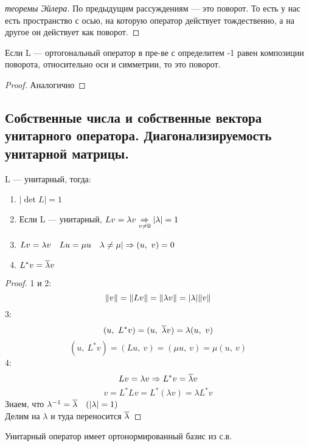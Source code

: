 \documentclass[main]{subfiles}
\begin{document}
\begin{proof}[теоремы Эйлера]
        По предыдущим рассуждениям --- это поворот. То есть у нас есть пространство с осью, на которую оператор действует тождественно, а на другое он действует как поворот.
    \end{proof}

    \begin{utv}
        Если L --- ортогональный оператор в пре-ве с определитем -1 равен композиции поворота, относительно оси и симметрии, то это поворот.
    \end{utv}

    \begin{proof}
        Аналогично
    \end{proof}

    \newpage
    \subsection{Собственные числа и собственные вектора унитарного оператора. Диагонализируемость унитарной матрицы.}

    \begin{utv}
        L --- унитарный, тогда:
		\begin{enumerate}
			\item $|\det L| = 1$
			\item Если L --- унитарный, $Lv = \lambda v \underset{v \neq 0}{\Rightarrow} |\lambda| = 1$
			\item $Lv = \lambda v \quad Lu = \mu u \quad \lambda \neq \mu | \Rightarrow (u,\ v) = 0$
            \item $L^* v = \overline{\lambda} v$
		\end{enumerate}
	\end{utv}

	\begin{proof}
		1 и 2:
		\[\lVert v \rVert = \lVert Lv \rVert = \lVert \lambda v \rVert = |\lambda| \lVert v \rVert\]
		3:
		\[(u,\ L^* v) = (u,\ \ol{\lambda} v) = \lambda (u,\ v)\]
		\[(u,\ L^* v) = (Lu,\ v) = (\mu u,\ v) = \mu(u,\ v)\]
		4:
        \[Lv = \lambda v \Rightarrow L^* v = \overline{\lambda} v\]
		\[v = L^* L v = L^* (\lambda v) = \lambda L^* v\]
        Знаем, что $\lambda^{-1} = \overline{\lambda} \quad (|\lambda| = 1)$\\
		Делим на $\lambda$ и туда переносится $\overline{\lambda}$
	\end{proof}

    \begin{theorem}
        Унитарный оператор имеет ортонормированный базис из с.в.
    \end{theorem}
\end{document}
